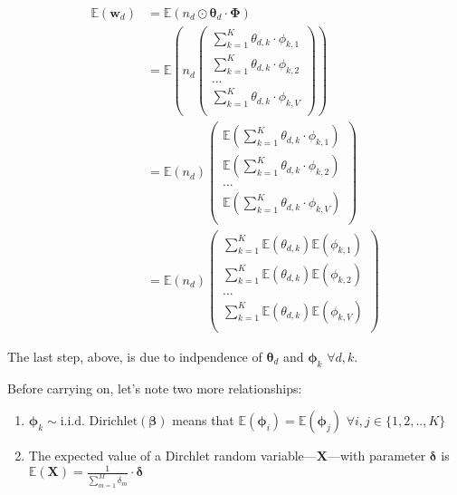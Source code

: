 \documentclass[conference,final,]{IEEEtran}
\providecommand{\tightlist}{%
  \setlength{\itemsep}{0pt}\setlength{\parskip}{0pt}}
\begin{document}
\begin{align*}
  \mathbb{E}(\mathbf{w}_d) 
    &= \mathbb{E}\left(n_d \odot 
      \boldsymbol\theta_d \cdot \boldsymbol\Phi\right)\\
    &= \mathbb{E}\left(n_d
      \begin{pmatrix}
        \sum_{k = 1}^K \theta_{d,k} \cdot \phi_{k,1}\\
        \sum_{k = 1}^K \theta_{d,k} \cdot \phi_{k,2}\\
        ...\\
        \sum_{k = 1}^K \theta_{d,k} \cdot \phi_{k,V}\\
      \end{pmatrix}
    \right)\\
    &= \mathbb{E}(n_d)
      \begin{pmatrix}
        \mathbb{E}(\sum_{k = 1}^K \theta_{d,k} \cdot \phi_{k,1})\\
        \mathbb{E}(\sum_{k = 1}^K \theta_{d,k} \cdot \phi_{k,2})\\
        ...\\
        \mathbb{E}(\sum_{k = 1}^K \theta_{d,k} \cdot \phi_{k,V})\\
      \end{pmatrix}\\
    &= \mathbb{E}(n_d)
      \begin{pmatrix}
        \sum_{k = 1}^K \mathbb{E}(\theta_{d,k}) \mathbb{E}(\phi_{k,1})\\
        \sum_{k = 1}^K \mathbb{E}(\theta_{d,k})\mathbb{E}(\phi_{k,2})\\
        ...\\
        \sum_{k = 1}^K \mathbb{E}(\theta_{d,k}) \mathbb{E}(\phi_{k,V})\\
      \end{pmatrix}
\end{align*}

The last step, above, is due to indpendence of \(\boldsymbol\theta_d\)
and \(\boldsymbol\phi_k\) \(\forall d,k\).

Before carrying on, let's note two more relationships:

\begin{enumerate}
\def\labelenumi{\arabic{enumi}.}
\tightlist
\item
  \(\boldsymbol\phi_k \sim \text{i.i.d. Dirichlet}(\boldsymbol\beta)\)
  means that
  \(\mathbb{E}(\boldsymbol\phi_i) = \mathbb{E}(\boldsymbol\phi_j)\)
  \(\forall i,j \in \{1,2,..,K\}\)
\item
  The expected value of a Dirchlet random
  variable---\(\mathbf{X}\)---with parameter \(\boldsymbol\delta\) is
  \(\mathbb{E}(\mathbf{X}) = \frac{1}{\sum_{m=1}^M\delta_m}\cdot\boldsymbol\delta\)
\end{enumerate}
\end{document}
